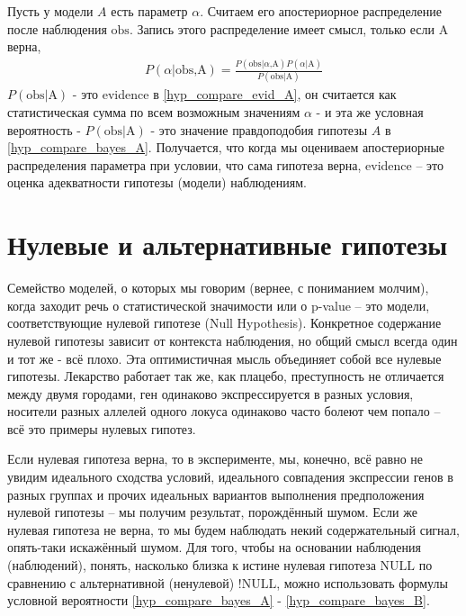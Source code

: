 \documentclass{book}
\begin{document}
 Пусть у модели $A$ есть параметр $\alpha$. Считаем его апостериорное распределение после наблюдения $\text{obs}$. Запись этого распределение имеет смысл, только если $\text{A}$ верна,
\begin{align}\label{hyp_compare_evid_A}
   P\left(\alpha\text{|obs,A}\right)=\frac{P\left(\text{obs|}\alpha\text{,A}\right) P\left(\alpha\text{|A}\right)}{P\left(\text{obs|A}\right)}
\end{align}
$P\left(\text{obs|A}\right)$ - это evidence в \eqref{hyp_compare_evid_A}, он считается как статистическая сумма по всем возможным значениям $\alpha$ - и эта же условная вероятность - $P\left(\text{obs|A}\right)$ - это значение правдоподобия гипотезы $A$ в \eqref{hyp_compare_bayes_A}. Получается, что когда мы оцениваем апостериорные распределения параметра при условии, что сама гипотеза верна, evidence -- это оценка адекватности гипотезы (модели) наблюдениям. 

\section*{Нулевые и альтернативные гипотезы}

Семейство моделей, о которых мы говорим (вернее, с пониманием молчим), когда заходит речь о статистической значимости или о p-value -- это модели, соответствующие нулевой гипотезе (Null Hypothesis). Конкретное содержание нулевой гипотезы зависит от контекста наблюдения, но общий смысл всегда один и тот же - всё плохо. Эта оптимистичная мысль объединяет собой все нулевые гипотезы. Лекарство работает так же, как плацебо, преступность не отличается между двумя городами, ген одинаково экспрессируется в разных условия, носители разных аллелей одного локуса одинаково часто болеют чем попало -- всё это примеры нулевых гипотез. 

Если нулевая гипотеза верна, то в эксперименте, мы, конечно, всё равно не увидим идеального сходства условий, идеального совпадения экспрессии генов в разных группах и прочих идеальных вариантов выполнения предположения нулевой гипотезы -- мы получим результат, порождённый шумом. Если же нулевая гипотеза не верна, то мы будем наблюдать некий содержательный сигнал, опять-таки искажённый шумом. Для того, чтобы на основании наблюдения (наблюдений), понять, насколько близка к истине нулевая гипотеза $\text{NULL}$ по сравнению с альтернативной (ненулевой) $\text{!NULL}$, можно использовать формулы условной вероятности \eqref{hyp_compare_bayes_A} - \eqref{hyp_compare_bayes_B}. 
\end{document}
